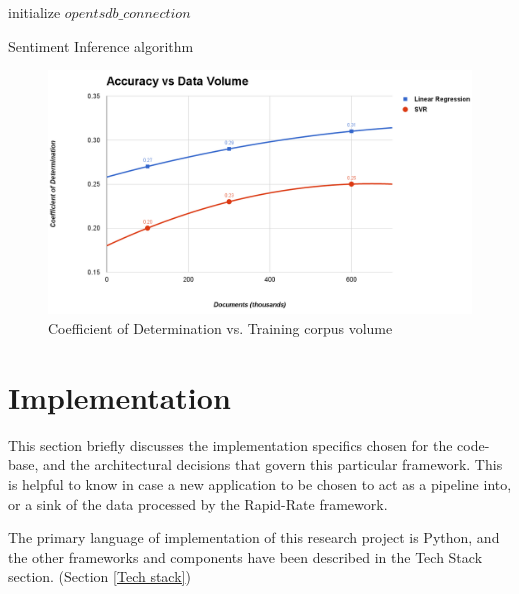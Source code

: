 \documentclass[conference]{IEEEtran}
\begin{document}
\begin{algorithm}[ht] \label{infer_sentiment}
    \DontPrintSemicolon 
    initialize $opentsdb\_connection$
    \;
    \;
    \caption{Sentiment Inference algorithm}
\end{algorithm}

\begin{figure}[ht] \label{fig:accuracy-v-data}
    \centering
    \includegraphics[width=\textwidth]{images/accuracy-vs-data.png}
    \caption{Coefficient of Determination vs. Training corpus volume}
\end{figure}

\section{Implementation}
    This section briefly discusses the implementation specifics chosen for the code-base, and the architectural decisions that govern this particular framework. This is helpful to know in case a new application to be chosen to act as a pipeline into, or a sink of the data processed by the Rapid-Rate framework.

    The primary language of implementation of this research project is Python, and the other frameworks and components have been described in the Tech Stack section. (Section \ref{Tech stack})
\end{document}
